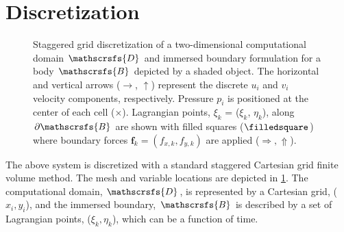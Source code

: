 \documentclass{article}
\numberwithin{equation}{section}
\begin{document}
\section{Discretization}\label{sec:discretization}

\begin{figure}[H] %
  \caption{Staggered grid discretization of a two-dimensional computational domain $\mathscrsfs{D}$ and immersed boundary formulation for a body $\mathscrsfs{B}$ depicted by a shaded object. The horizontal and vertical arrows ($\rightarrow$, $\uparrow$) represent the discrete $u_i$ and $v_i$ velocity components, respectively. Pressure $p_i$ is positioned at the center of each cell ($\times$). Lagrangian points, $\xi_k$ = ($\xi_k$, $\eta_k$), along $\partial\mathscrsfs{B}$ are shown with filled squares ($\filledsquare$) where boundary forces $\boldsymbol{f}_k=(f_{x,k},f_{y,k})$ are applied ($\Rightarrow,\Uparrow$).}\label{fig:1}
\end{figure}

The above system is discretized with a standard staggered Cartesian grid finite volume method. The mesh and variable locations are depicted in \cref{fig:1}. The computational domain, $\mathscrsfs{D}$, is represented by a Cartesian grid, ($x_i, y_i$), and the immersed boundary, $\mathscrsfs{B}$ is described by a set of Lagrangian points, ($\xi_k,\eta_k$), which can be a function of time.
\end{document}
